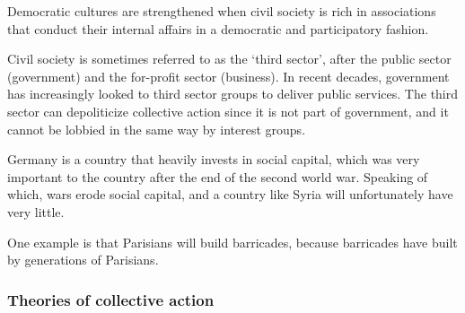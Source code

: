  Democratic cultures are
strengthened when civil society is rich in associations that conduct
their internal affairs in a democratic and participatory fashion.

Civil society is sometimes referred to as the `third sector', after
the public sector (government) and the for-profit sector
(business). In recent decades, government has increasingly looked to
third sector groups to deliver public services. The third sector can
depoliticize collective action since it is not part of government, and
it cannot be lobbied in the same way by interest groups.




Germany is a country that heavily invests in social capital, which was
very important to the country after the end of the second world
war. Speaking of which, wars erode social capital, and a country like
Syria will unfortunately have very little.

 One example is that Parisians will build
barricades, because barricades have built by generations of Parisians.


\subsubsection{Theories of collective action}


